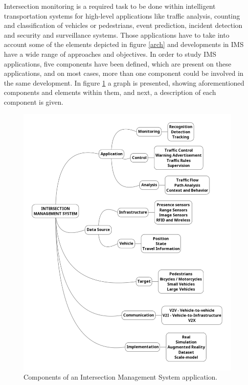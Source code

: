 Intersection monitoring is a required task to be done within intelligent transportation systems for high-level applications like traffic analysis, counting and classification of vehicles or pedestrians, event prediction, incident detection and security and surveillance systems. Those applications have to take into account some of the elements depicted in figure \ref{arch} and developments in IMS have a wide range of approaches and objectives. In order to study IMS applications, five components have been defined, which are present on these applications, and on most cases, more than one component could be involved in the same development. In figure  \ref{imsComps} a graph is presented, showing aforementioned components and elements within them, and next, a description of each component is given.


\begin{figure}[ht!]
\centering
\includegraphics[scale=0.38]{fig/2/ims_graph5.png}
\caption{Components of an Intersection Management System application.}
\label{imsComps}
\end{figure}

